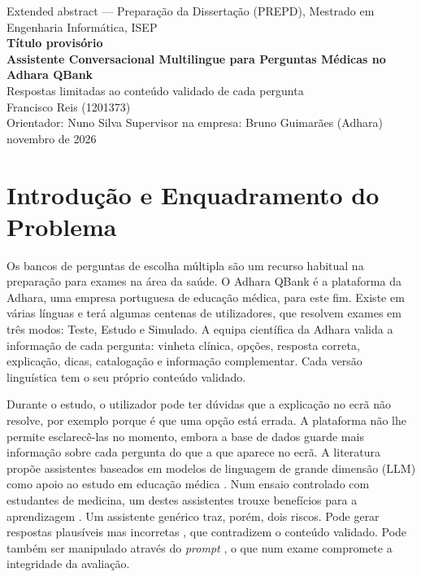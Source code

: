 \documentclass[11pt,a4paper]{article}
\begin{document}
\begin{center}
{\small Extended abstract --- Preparação da Dissertação (PREPD), Mestrado em Engenharia Informática, ISEP}\\[8pt]
{\small\textbf{Título provisório}}\\[2pt]
{\Large\bfseries Assistente Conversacional Multilingue para Perguntas Médicas no Adhara QBank}\\[3pt]
{\large Respostas limitadas ao conteúdo validado de cada pergunta}\\[8pt]
Francisco Reis (1201373)\\
{\small Orientador: Nuno Silva \quad Supervisor na empresa: Bruno Guimarães (Adhara)}\\
{\small novembro de 2026}
\end{center}

\section{Introdução e Enquadramento do Problema}

Os bancos de perguntas de escolha múltipla são um recurso habitual na preparação para exames na área da saúde. O Adhara QBank é a plataforma da Adhara, uma empresa portuguesa de educação médica, para este fim. Existe em várias línguas e terá algumas centenas de utilizadores, que resolvem exames em três modos: Teste, Estudo e Simulado. A equipa científica da Adhara valida a informação de cada pergunta: vinheta clínica, opções, resposta correta, explicação, dicas, catalogação e informação complementar. Cada versão linguística tem o seu próprio conteúdo validado.

Durante o estudo, o utilizador pode ter dúvidas que a explicação no ecrã não resolve, por exemplo porque é que uma opção está errada. A plataforma não lhe permite esclarecê-las no momento, embora a base de dados guarde mais informação sobre cada pergunta do que a que aparece no ecrã. A literatura propõe assistentes baseados em modelos de linguagem de grande dimensão (LLM) como apoio ao estudo em educação médica \parencite{abdalrazaq2023llm}. Num ensaio controlado com estudantes de medicina, um destes assistentes trouxe benefícios para a aprendizagem \parencite{gan2024orthopedic}. Um assistente genérico traz, porém, dois riscos. Pode gerar respostas plausíveis mas incorretas \parencite{hu2025advancing}, que contradizem o conteúdo validado. Pode também ser manipulado através do \emph{prompt} \parencite{emekci2025securing}, o que num exame compromete a integridade da avaliação.
\end{document}
